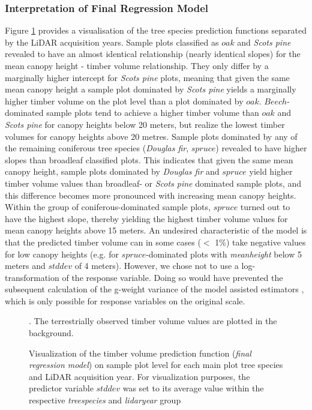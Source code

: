 \subsubsection*{Interpretation of Final Regression Model}
\label{sec:prop_regmod_final}
Figure \ref{fig:predlines_tspec} provides a visualisation of the tree species prediction functions separated by the LiDAR acquisition years. Sample plots classified as $oak$ and \textit{Scots pine} revealed to have an almost identical relationship (nearly identical slopes) for the mean canopy height - timber volume relationship. They only differ by a marginally higher intercept for \textit{Scots pine} plots, meaning that given the same mean canopy height a sample plot dominated by \textit{Scots pine} yields a marginally higher timber volume on the plot level than a plot dominated by $oak$. $Beech$-dominated sample plots tend to achieve a higher timber volume than $oak$ and \textit{Scots pine} for canopy heights below 20 meters, but realize the lowest timber volumes for canopy heights above 20 metres. Sample plots dominated by any of the remaining coniferous tree species (\textit{Douglas fir}, $spruce$) revealed to have higher slopes than broadleaf classified plots. This indicates that given the same mean canopy height, sample plots dominated by \textit{Douglas fir} and $spruce$ yield higher timber volume values than broadleaf- or \textit{Scots pine} dominated sample plots, and this difference becomes more pronounced with increasing mean canopy heights. Within the group of coniferous-dominated sample plots, $spruce$ turned out to have the highest slope, thereby yielding the highest timber volume values for mean canopy heights above 15 meters. An undesired characteristic of the model is that the predicted timber volume can in some cases ($<$ 1\%) take negative values for low canopy heights (e.g. for $spruce$-dominated plots with \textit{meanheight} below 5 meters and $stddev$ of 4 meters). However, we chose not to use a log-transformation of the response variable. Doing so would have prevented the subsequent calculation of the g-weight variance of the model assisted estimators \citep{mandallaz2013a, mandallaz2013b}, which is only possible for response variables on the original scale.

\begin{figure}[h]
\centering
{}
\caption{Visualization of the timber volume prediction function (\textit{final regression model}) on sample plot level for each main plot tree species and LiDAR acquisition year. For visualization purposes, the predictor variable $stddev$ was set to its average value within the respective \textit{treespecies} and \textit{lidaryear} group}. The terrestrially observed timber volume values are plotted in the background.
\label{fig:predlines_tspec}
\end{figure}


